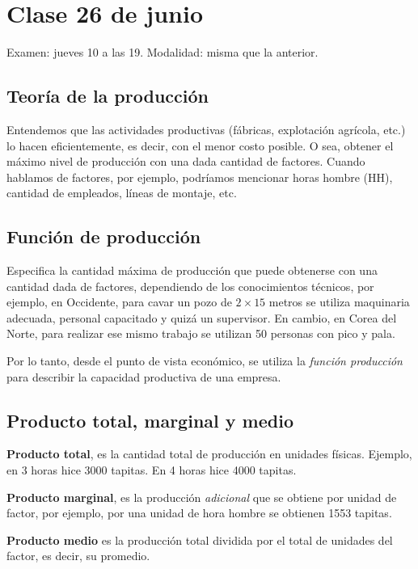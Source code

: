 \section{Clase 26 de junio}

Examen: jueves 10 a las 19.
Modalidad: misma que la anterior.

\subsection{Teoría de la producción}

Entendemos que las actividades productivas (fábricas, explotación agrícola,
etc.) lo hacen eficientemente, es decir,
con el menor costo posible.
O sea,
obtener el máximo nivel de producción con una dada cantidad de factores.
Cuando hablamos de factores, por ejemplo,
podríamos mencionar horas hombre (HH), cantidad de empleados,
líneas de montaje, etc.

\subsection{Función de producción}

Especifica la cantidad máxima de producción que puede obtenerse con una cantidad
dada de factores,
dependiendo de los conocimientos técnicos,
por ejemplo,
en Occidente,
para cavar un pozo de \(2\times15\) metros se utiliza maquinaria adecuada,
personal capacitado y quizá un supervisor.
En cambio,
en Corea del Norte,
para realizar ese mismo trabajo se utilizan 50 personas con pico y pala.

Por lo tanto,
desde el punto de vista económico,
se utiliza la \textit{función producción} para describir la capacidad productiva
de una empresa.

\subsection{Producto total, marginal y medio}

\textbf{Producto total}, es la cantidad total de producción en unidades físicas.
Ejemplo, en 3 horas hice 3000 tapitas. En 4 horas hice 4000 tapitas.

\textbf{Producto marginal},
es la producción \textit{adicional} que se obtiene por unidad de factor,
por ejemplo,
por una unidad de hora hombre se obtienen 1553 tapitas.

\textbf{Producto medio} es la producción total dividida por el total de unidades
del factor,
es decir,
su promedio.


